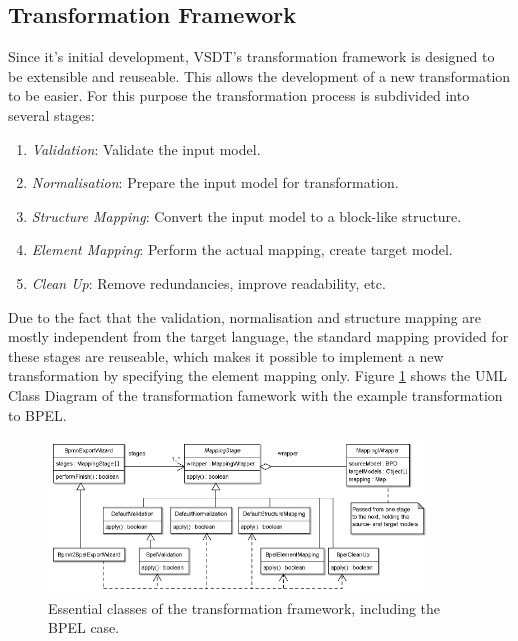 \subsection{Transformation Framework}
Since it's initial development, VSDT's transformation framework is designed to be extensible and reuseable. This allows the development of a new transformation to be easier. For this purpose the transformation process is subdivided into several stages: 
\begin{enumerate}
	\item \textit{Validation}: Validate the input model.
	\item \textit{Normalisation}: Prepare the input model for transformation.
	\item \textit{Structure Mapping}: Convert the input model to a block-like structure.
	\item \textit{Element Mapping}: Perform the actual mapping, create target model.
	\item \textit{Clean Up}: Remove redundancies, improve readability, etc.
\end{enumerate}

Due to the fact that the validation, normalisation and structure mapping are mostly independent from the target language, the standard mapping provided for these stages are reuseable, which makes it possible to implement a new transformation by specifying the element mapping only. Figure \ref{fig:transform} shows the UML Class Diagram of the transformation famework with the example transformation to BPEL.
\begin{figure}[h]
	\centering
		\includegraphics[width=0.90\textwidth]{images/transformation.png}
	\caption{Essential classes of the transformation framework, including the BPEL case.\cite{TK07}}
	\label{fig:transform}
\end{figure}\\

